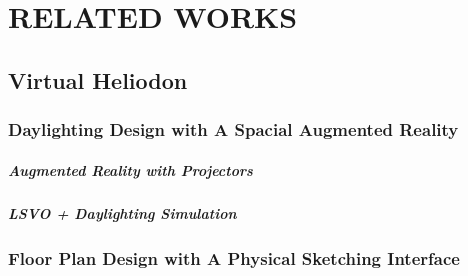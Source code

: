 \chapter{RELATED WORKS} \label{sec:introduction}

\section{Virtual Heliodon}

	\subsection{Daylighting Design with A Spacial Augmented Reality}

		\paragraph{Augmented Reality with Projectors}

		\paragraph{LSVO + Daylighting Simulation}

	\subsection{Floor Plan Design with A Physical Sketching Interface}

